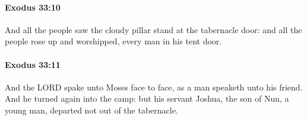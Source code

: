 		\paragraph{Exodus 33:10} %
			\label{EXODUS-33-10}

			And all the people saw the cloudy pillar stand at the tabernacle door: and all the people rose up and worshipped, every man in his tent door.


		\paragraph{Exodus 33:11} %
			\label{EXODUS-33-11}

			And the LORD spake unto Moses face to face, as a man speaketh unto his friend. And he turned again into the camp: but his servant Joshua, the son of Nun, a young man, departed not out of the tabernacle.


